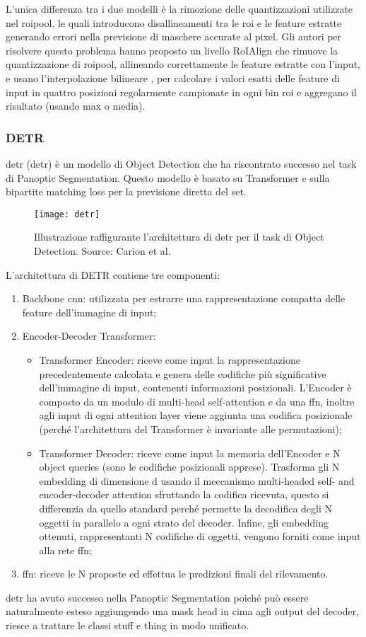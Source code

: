 L'unica differenza tra i due modelli è la rimozione delle quantizzazioni utilizzate nel \acrshort{roipool}, le quali introducono disallineamenti tra le \acrshort{roi} e le feature estratte generando errori nella previsione di maschere accurate al pixel. Gli autori per risolvere questo problema hanno proposto un livello RoIAlign che rimuove la quantizzazione di \acrshort{roipool}, allineando correttamente le feature estratte con l'input, e usano l'interpolazione bilineare \cite{jaderberg2015spatial}, per calcolare i valori esatti delle feature di input in quattro posizioni regolarmente campionate in ogni bin \acrshort{roi} e aggregano il risultato (usando max o media).


\subsubsection{DETR} \label{detr_section}
\acrshort{detr} (\acrlong{detr}) \cite{carion2020end} è un modello di Object Detection che ha riscontrato successo nel task di Panoptic Segmentation. Questo modello è basato su Transformer e sulla bipartite matching loss per la previsione diretta del set.
\begin{figure}[ht]
\centering
\texttt{[image: detr]}
\caption{Illustrazione raffigurante l'architettura di \acrshort{detr} per il task di Object Detection. Source: Carion et al. \cite{carion2020end}}\label{detr_img}
\end{figure}



L'architettura di DETR contiene tre componenti:
\begin{enumerate}
    \item Backbone \acrshort{cnn}: utilizzata per estrarre una rappresentazione compatta delle feature dell'immagine di input;
    \item Encoder-Decoder Transformer: 
    \begin{itemize}
        \item Transformer Encoder: riceve come input la rappresentazione precedentemente calcolata e genera delle codifiche più significative dell'immagine di input, contenenti informazioni posizionali.
        L'Encoder è composto da un modulo di multi-head self-attention e da una \acrfull{ffn}, inoltre agli input di ogni attention layer viene aggiunta una codifica posizionale (perché l'architettura del Transformer è invariante alle permutazioni);
        \item Transformer Decoder: riceve come input la memoria dell'Encoder e N object queries (sono le codifiche posizionali apprese). Trasforma gli N embedding di dimensione d usando il meccanismo multi-headed self- and encoder-decoder attention sfruttando la codifica ricevuta, questo si differenzia da quello standard perché permette la decodifica degli N oggetti in parallelo a ogni strato del decoder. Infine, gli embedding ottenuti, rappresentanti N codifiche di oggetti, vengono forniti come input alla rete \acrshort{ffn};
    \end{itemize}
    \item \acrfull{ffn}: riceve le N proposte ed effettua le predizioni finali del rilevamento.
\end{enumerate}

\acrshort{detr} ha avuto successo nella Panoptic Segmentation poiché può essere naturalmente esteso aggiungendo una mask head in cima agli output del decoder, riesce a trattare le classi stuff e thing in modo unificato.


